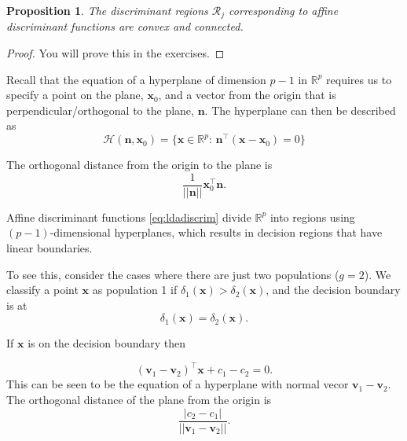 \documentclass[
]{book}
\newtheorem{proposition}{Proposition}[chapter]
\theoremstyle{definition}
\theoremstyle{definition}
\theoremstyle{definition}
\theoremstyle{definition}
\theoremstyle{remark}
\begin{document}
\begin{proposition}
\protect\hypertarget{prp:ldaconvex}{}{\label{prp:ldaconvex} }The discriminant regions \(\mathcal{R}_j\) corresponding to affine discriminant functions are convex and connected.
\end{proposition}

\begin{proof}
You will prove this in the exercises.
\end{proof}

Recall that the equation of a hyperplane of dimension \(p-1\) in \(\mathbb{R}^p\) requires us to specify a point on the plane, \(\mathbf x_0\), and a vector from the origin that is perpendicular/orthogonal to the plane, \(\mathbf n\). The hyperplane can then be described as
\[
\mathcal{H}(\mathbf n, \mathbf x_0) =\{\mathbf x\in \mathbb{R}^p:\, \mathbf n^\top (\mathbf x-\mathbf x_0)  =0\}
\]

The orthogonal distance from the origin to the plane is
\[\frac{1}{||\mathbf n||}\mathbf x_0^\top \mathbf n.\]

Affine discriminant functions \eqref{eq:ldadiscrim} divide \(\mathbb{R}^p\) into regions using \((p-1)\)-dimensional hyperplanes, which results in decision regions that have linear boundaries.

To see this, consider the cases where there are just two populations (\(g=2\)). We classify a point \(\mathbf x\) as population 1 if \(\delta_1(\mathbf x) > \delta_2(\mathbf x)\), and the decision boundary is at
\[\delta_1(\mathbf x) = \delta_2(\mathbf x).\]

If \(\mathbf x\) is on the decision boundary then

\[(\mathbf v_1-\mathbf v_2)^\top \mathbf x+ c_1 -c_2=0.\]
This can be seen to be the equation of a hyperplane with normal vecor \(\mathbf v_1-\mathbf v_2\). The orthogonal distance of the plane from the origin is
\[\frac{|c_2-c_1|}{||\mathbf v_1-\mathbf v_2||}.\]
\end{document}
